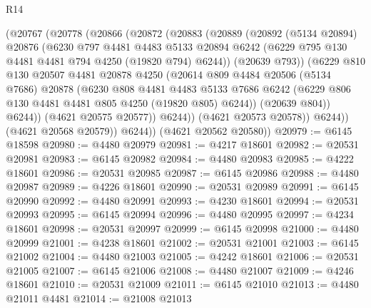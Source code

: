 \begin{lexlean}{R14}
\begin{coremodule}
              (@20767
                (@20778
                  (@20866
                    (@20872
                      (@20883
                        (@20889
                          (@20892
                            (@5134 @20894)
                            @20876
                            (@6230
                              @797
                              @4481
                              @4483
                              @5133
                              @20894
                              @6242
                              (@6229 @795 @130 @4481 @4481 @794 @4250 (@19820 @794) @6244))
                            (@20639 @793))
                          (@6229
                            @810
                            @130
                            @20507
                            @4481
                            @20878
                            @4250
                            (@20614
                              @809
                              @4484
                              @20506
                              (@5134 @7686)
                              @20878
                              (@6230
                                @808
                                @4481
                                @4483
                                @5133
                                @7686
                                @6242
                                (@6229 @806 @130 @4481 @4481 @805 @4250 (@19820 @805) @6244))
                              (@20639 @804))
                            @6244))
                        (@4621 @20575 @20577))
                      @6244))
                  (@4621 @20573 @20578))
                @6244))
            (@4621 @20568 @20579))
          @6244))
      (@4621 @20562 @20580))
@20979 := @6145 @18598
@20980 := @4480 @20979
@20981 := @4217 @18601
@20982 := @20531 @20981
@20983 := @6145 @20982
@20984 := @4480 @20983
@20985 := @4222 @18601
@20986 := @20531 @20985
@20987 := @6145 @20986
@20988 := @4480 @20987
@20989 := @4226 @18601
@20990 := @20531 @20989
@20991 := @6145 @20990
@20992 := @4480 @20991
@20993 := @4230 @18601
@20994 := @20531 @20993
@20995 := @6145 @20994
@20996 := @4480 @20995
@20997 := @4234 @18601
@20998 := @20531 @20997
@20999 := @6145 @20998
@21000 := @4480 @20999
@21001 := @4238 @18601
@21002 := @20531 @21001
@21003 := @6145 @21002
@21004 := @4480 @21003
@21005 := @4242 @18601
@21006 := @20531 @21005
@21007 := @6145 @21006
@21008 := @4480 @21007
@21009 := @4246 @18601
@21010 := @20531 @21009
@21011 := @6145 @21010
@21013 := @4480 @21011 @4481
@21014 := @21008 @21013

\end{coremodule}
\end{lexlean}
